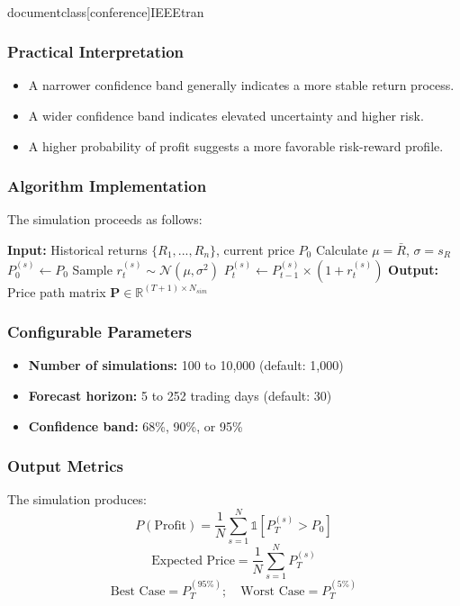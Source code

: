 \\documentclass[conference]{IEEEtran}
\begin{document}
\subsubsection{Practical Interpretation}
\begin{itemize}
    \item A narrower confidence band generally indicates a more stable return process.
    \item A wider confidence band indicates elevated uncertainty and higher risk.
    \item A higher probability of profit suggests a more favorable risk-reward profile.
\end{itemize}

\subsubsection{Algorithm Implementation}
The simulation proceeds as follows:

\begin{algorithmic}
\STATE \textbf{Input:} Historical returns $\{R_1, ..., R_n\}$, current price $P_0$
\STATE Calculate $\mu = \bar{R}$, $\sigma = s_R$
    \STATE $P_0^{(s)} \leftarrow P_0$
        \STATE Sample $r_t^{(s)} \sim \mathcal{N}(\mu, \sigma^2)$
        \STATE $P_t^{(s)} \leftarrow P_{t-1}^{(s)} \times (1 + r_t^{(s)})$
    \ENDFOR
\ENDFOR
\STATE \textbf{Output:} Price path matrix $\mathbf{P} \in \mathbb{R}^{(T+1) \times N_{sim}}$
\end{algorithmic}

\subsubsection{Configurable Parameters}
\begin{itemize}
    \item \textbf{Number of simulations:} 100 to 10,000 (default: 1,000)
    \item \textbf{Forecast horizon:} 5 to 252 trading days (default: 30)
    \item \textbf{Confidence band:} 68\%, 90\%, or 95\%
\end{itemize}

\subsubsection{Output Metrics}
The simulation produces:
\begin{equation}
    P(\text{Profit}) = \frac{1}{N}\sum_{s=1}^{N} \mathbb{1}[P_T^{(s)} > P_0]
\end{equation}
\begin{equation}
    \text{Expected Price} = \frac{1}{N}\sum_{s=1}^{N} P_T^{(s)}
\end{equation}
\begin{equation}
    \text{Best Case} = P_T^{(95\%)}; \quad \text{Worst Case} = P_T^{(5\%)}
\end{equation}
\end{document}
